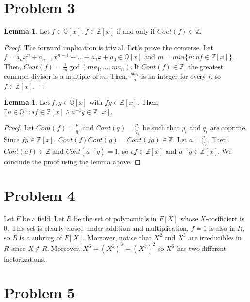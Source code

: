 \documentclass{article}
\theoremstyle{definition}
\newtheorem{lemma}[theorem]{Lemma}
\begin{document}
\section{Problem 3}

\begin{lemma}
    Let $f \in \mathbb{Q}[x]$. $f \in \mathbb{Z}[x]$ if and only if $Cont(f) \in \mathbb{Z}$.
\end{lemma}
\begin{proof}
    The forward implication is trivial. Let's prove the converse. Let $f = a_{n}x^{n} + a_{n-1}x^{n-1} + ... + a_{1}x + a_{0}\in \mathbb{Q}[x]$ and $m = min\{n : nf \in \mathbb{Z}[x]\}$. Then, $Cont(f) = \frac{1}{m} \gcd{(ma_{1},...,ma_{n})}$. If $Cont(f) \in \mathbb{Z}$, the greatest common divisor is a multiple of $m$. Then, $\frac{m a_{i}}{m}$ is an integer for every $i$, so $f \in \mathbb{Z}[x]$.
\end{proof}

\begin{lemma}
    Let $f,g \in \mathbb{Q}[x]$ with $fg \in \mathbb{Z}[x]$. Then, $\exists a \in \mathbb{Q}^{\times}: af \in \mathbb{Z}[x] \land a^{-1}g \in \mathbb{Z}[x]$.
\end{lemma}
\begin{proof}
    Let $Cont(f) = \frac{p_{1}}{q_{1}}$ and $Cont(g) = \frac{p_{2}}{q_{2}}$ be such that $p_{i}$ and $q_{i}$ are coprime. Since $fg \in \mathbb{Z}[x]$, $Cont(f)Cont(g) = Cont(fg) \in \mathbb{Z}$. Let $a = \frac{p_{2}}{q_{2}}$. Then, $Cont(af) \in \mathbb{Z}$ and $Cont(a^{-1}g) = 1$, so $af \in \mathbb{Z}[x]$ and $a^{-1}g \in \mathbb{Z}[x]$. We conclude the proof using the lemma above.
\end{proof}

\section{Problem 4}

Let $F$ be a field. 
Let $R$ be the set of polynomials in $F[X]$ whose $X$-coefficient is 0. This set is clearly closed under addition and multiplication. $f = 1$ is also in $R$, so $R$ is a subring of $F[X]$. Moreover, notice that $X^{2}$ and $X^{3}$ are irreducibles in $R$ since $X \notin R$. Moreover, $X^{6} = (X^{2})^{3} = (X^{3})^{2}$ so $X^{6}$ has two different factorizations.

\section{Problem 5}
\end{document}

